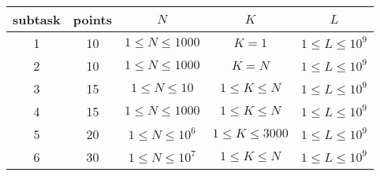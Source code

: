 \begin{center}
\begin{tabular}{ |c|c|c|c|c| }
\hline
subtask & points & $N$ & $K$ & $L$\\
\hline
1 & 10 & $1 \le N \le 1000$ & $K = 1$ & $1 \le L \le 10^9$\\
\hline
2 & 10 & $1 \le N \le 1000$ & $K = N$ & $1 \le L \le 10^9$\\
\hline
3 & 15 & $1 \le N \le 10$ & $1 \le K \le N$ & $1 \le L \le 10^9$\\
\hline
4 & 15 & $1 \le N \le 1000$ & $1 \le K \le N$ & $1 \le L \le 10^9$\\
\hline
5 & 20 & $1 \le N \le 10^6$ & $1\le K \le 3000$ & $1 \le L \le 10^9$\\
\hline
6 & 30 & $1 \le N \le 10^7$ & $1 \le K \le N$ & $1 \le L \le 10^9$\\
\hline
\end{tabular}
\end{center}
